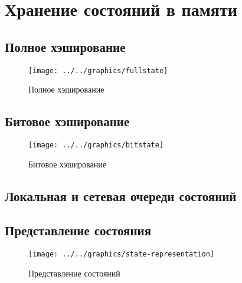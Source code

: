 \chapter{Хранение состояний в памяти}
\label{cha:state-store}

\section{Полное хэширование}
\label{sec:fullstate}

\begin{figure}[ht]
  \centering
  \texttt{[image: ../../graphics/fullstate]}
  
  \caption{Полное хэширование}
  \label{fig:fullstate}
\end{figure}

\section{Битовое хэширование}
\label{sec:buthash}

\begin{figure}[ht]
  \centering
  \texttt{[image: ../../graphics/bitstate]}  
  \caption{Битовое хэширование}
  \label{fig:bitstate}
\end{figure}

\section{Локальная и сетевая очереди состояний}
\label{sec:local-network-queue}


\section{Представление состояния}
\label{sec:state-represent}

\begin{figure}[ht]
  \centering
  \texttt{[image: ../../graphics/state-representation]}  
  \caption{Представление состояний}
  \label{fig:state-repr}
\end{figure}

